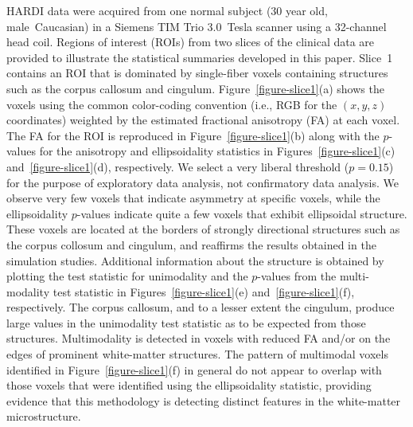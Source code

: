 \documentclass[dvips,aoas,preprint]{imsart}
\numberwithin{equation}{section}
\theoremstyle{plain}
\begin{document}
HARDI data were acquired from one normal subject (30 year old,
male~Caucasian) in a Siemens TIM Trio 3.0~Tesla scanner using a
32-channel head coil.  
Regions of interest (ROIs) from two slices of the clinical data are
provided to illustrate the statistical summaries developed in this
paper.  Slice~1 contains an ROI that is dominated by single-fiber
voxels containing structures such as the corpus callosum and cingulum.
Figure~\ref{figure-slice1}(a) shows the voxels using the common
color-coding convention (i.e., RGB for the $(x,y,z)$ coordinates)
weighted by the estimated fractional anisotropy (FA) at each voxel.
The FA for the ROI is reproduced in Figure~\ref{figure-slice1}(b)
along with the $p$-values for the anisotropy and ellipsoidality
statistics in Figures~\ref{figure-slice1}(c)
and~\ref{figure-slice1}(d), respectively.  We select a very liberal
threshold ($p=0.15$) for the purpose of exploratory data analysis, not
confirmatory data analysis.  We observe very few voxels that indicate
asymmetry at specific voxels, while the ellipsoidality $p$-values
indicate quite a few voxels that exhibit ellipsoidal structure.  These
voxels are located at the borders of strongly directional structures
such as the corpus collosum and cingulum, and reaffirms the results
obtained in the simulation studies.  Additional information about the
structure is obtained by plotting the test statistic for unimodality
and the $p$-values from the multi-modality test statistic in
Figures~\ref{figure-slice1}(e) and~\ref{figure-slice1}(f),
respectively.  The corpus callosum, and to a lesser extent the
cingulum, produce large values in the unimodality test statistic as to
be expected from those structures.  Multimodality is detected in
voxels with reduced FA and/or on the edges of prominent white-matter
structures.  The pattern of multimodal voxels identified in
Figure~\ref{figure-slice1}(f) in general do not appear to overlap with
those voxels that were identified using the ellipsoidality statistic,
providing evidence that this methodology is detecting distinct
features in the white-matter microstructure.
\end{document}
